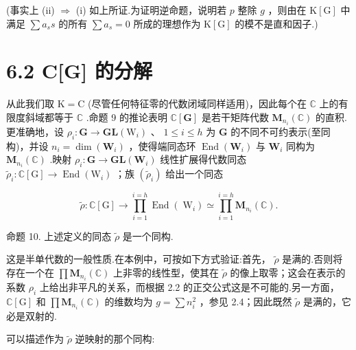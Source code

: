 \documentclass[10pt]{article}
\begin{document}
(事实上 (ii) \(\Rightarrow\) (i) 如上所证.为证明逆命题，说明若 \(p\) 整除 \(g\) ，则由在 \(\mathrm{K}\left\lbrack  \mathrm{G}\right\rbrack\) 中满足 \(\sum {a}_{s}s\) 的所有 \(\sum {a}_{s} = 0\) 所成的理想作为 \(\mathrm{K}\left\lbrack  \mathrm{G}\right\rbrack\) 的模不是直和因子.)

\section*{6.2 C[G] 的分解}

从此我们取 \(\mathrm{K} = \mathrm{C}\) (尽管任何特征零的代数闭域同样适用)，因此每个在 \(\mathbb{C}\) 上的有限度斜域都等于 \(\mathbb{C}\) .命题 9 的推论表明 \(\mathbb{C}\left\lbrack  \mathbf{G}\right\rbrack\) 是若干矩阵代数 \({\mathbf{M}}_{{n}_{i}}\left( \mathbb{C}\right)\) 的直积.更准确地，设 \({\rho }_{i} : \mathbf{G} \rightarrow  \mathbf{{GL}}\left( {\mathrm{W}}_{i}\right)\) 、 \(1 \leq  i \leq  h\) 为 \(\mathbf{G}\) 的不同不可约表示(至同构)，并设 \({n}_{i} = \dim \left( {\mathbf{W}}_{i}\right)\) ，使得端同态环 \(\operatorname{End}\left( {\mathbf{W}}_{i}\right)\) 与 \({\mathbf{W}}_{i}\) 同构为 \({\mathbf{M}}_{{n}_{i}}\left( \mathbb{C}\right)\) .映射 \({\rho }_{i} : \mathbf{G} \rightarrow  \mathbf{{GL}}\left( {\mathbf{W}}_{i}\right)\) 线性扩展得代数同态 \({\widetilde{\rho }}_{i} : \mathbb{C}\left\lbrack  \mathrm{G}\right\rbrack   \rightarrow  \operatorname{End}\left( {\mathrm{W}}_{i}\right)\) ；族 \(\left( {\widetilde{\rho }}_{i}\right)\) 给出一个同态

\[
\widetilde{\rho } : \mathbb{C}\left\lbrack  \mathrm{G}\right\rbrack   \rightarrow  \mathop{\prod }\limits_{{i = 1}}^{{i = h}}\operatorname{End}\left( {\mathrm{\;W}}_{i}\right)  \simeq  \mathop{\prod }\limits_{{i = 1}}^{{i = h}}{\mathbf{M}}_{{n}_{i}}\left( \mathbb{C}\right) .
\]

命题 10. 上述定义的同态 \(\widetilde{\rho }\) 是一个同构.

这是半单代数的一般性质.在本例中，可按如下方式验证:首先， \(\widetilde{\rho }\) 是满的.否则将存在一个在 \(\prod {\mathbf{M}}_{{n}_{i}}\left( \mathbb{C}\right)\) 上非零的线性型，使其在 \(\widetilde{\rho }\) 的像上取零；这会在表示的系数 \({\rho }_{i}\) 上给出非平凡的关系，而根据 2.2 的正交公式这是不可能的.另一方面， \(\mathbb{C}\left\lbrack  \mathrm{G}\right\rbrack\) 和 \(\prod {\mathbf{M}}_{{n}_{i}}\left( \mathbb{C}\right)\) 的维数均为 \(g = \sum {n}_{i}^{2}\) ，参见 2.4；因此既然 \(\widetilde{\rho }\) 是满的，它必是双射的.

可以描述作为 \(\widetilde{\rho }\) 逆映射的那个同构:
\end{document}
